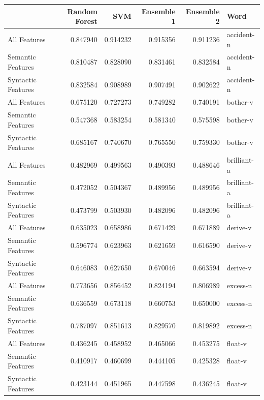 \documentclass[12pt]{article}
\begin{document}
\begin{tabular}{lrrrrl}
\toprule
{} &  Random Forest &       SVM &  Ensemble 1 &  Ensemble 2 &         Word \\
\midrule
All Features       &       0.847940 &  0.914232 &    0.915356 &    0.911236 &   accident-n \\
Semantic Features  &       0.810487 &  0.828090 &    0.831461 &    0.832584 &   accident-n \\
Syntactic Features &       0.832584 &  0.908989 &    0.907491 &    0.902622 &   accident-n \\
All Features       &       0.675120 &  0.727273 &    0.749282 &    0.740191 &     bother-v \\
Semantic Features  &       0.547368 &  0.583254 &    0.581340 &    0.575598 &     bother-v \\
Syntactic Features &       0.685167 &  0.740670 &    0.765550 &    0.759330 &     bother-v \\
All Features       &       0.482969 &  0.499563 &    0.490393 &    0.488646 &  brilliant-a \\
Semantic Features  &       0.472052 &  0.504367 &    0.489956 &    0.489956 &  brilliant-a \\
Syntactic Features &       0.473799 &  0.503930 &    0.482096 &    0.482096 &  brilliant-a \\
All Features       &       0.635023 &  0.658986 &    0.671429 &    0.671889 &     derive-v \\
Semantic Features  &       0.596774 &  0.623963 &    0.621659 &    0.616590 &     derive-v \\
Syntactic Features &       0.646083 &  0.627650 &    0.670046 &    0.663594 &     derive-v \\
All Features       &       0.773656 &  0.856452 &    0.824194 &    0.806989 &     excess-n \\
Semantic Features  &       0.636559 &  0.673118 &    0.660753 &    0.650000 &     excess-n \\
Syntactic Features &       0.787097 &  0.851613 &    0.829570 &    0.819892 &     excess-n \\
All Features       &       0.436245 &  0.458952 &    0.465066 &    0.453275 &      float-v \\
Semantic Features  &       0.410917 &  0.460699 &    0.444105 &    0.425328 &      float-v \\
Syntactic Features &       0.423144 &  0.451965 &    0.447598 &    0.436245 &      float-v \\

\end{tabular}
\end{document}
